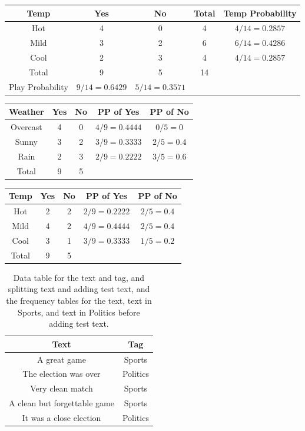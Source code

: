 \documentclass[12pt,twoside]{report}   %
\begin{document}
\begin{table}[H]
  \centering
  \begin{tabular}{|c|c|c|c|c|}
    \hline
    Temp & Yes & No & Total & Temp Probability\\
\hline
Hot & 4 & 0 & 4 & $4/14=0.2857$\\
Mild & 3 & 2 & 6 & $6/14=0.4286$\\ 
Cool & 2 & 3 & 4 & $4/14=0.2857$\\
\hline
Total & 9 & 5 & 14 &\\
\hline
Play Probability & $9/14=0.6429$ & $5/14=0.3571$ &&\\
    \hline
  \end{tabular}
\end{table}
\begin{table}[H]
  \centering
  \begin{tabular}{|c|c|c|c|c|}
    \hline
    Weather & Yes & No & PP of Yes & PP of No\\
\hline
Overcast & 4 & 0 & $4/9=0.4444$ & $0/5=0$\\
Sunny & 3 & 2 & $3/9=0.3333$ & $2/5=0.4$\\ 
Rain & 2 & 3 & $2/9=0.2222$ & $3/5=0.6$\\
\hline
Total & 9 & 5 &&\\
    \hline
  \end{tabular}
\end{table}
\begin{table}[H]
  \centering
  \begin{tabular}{|c|c|c|c|c|}
    \hline
    Temp & Yes & No & PP of Yes & PP of No\\
\hline
Hot & 2 & 2 & $2/9=0.2222$ & $2/5=0.4$\\
Mild & 4 & 2 & $4/9=0.4444$ & $2/5=0.4$\\ 
Cool & 3 & 1 & $3/9=0.3333$ & $1/5=0.2$\\
\hline
Total & 9 & 5 &&\\
    \hline
  \end{tabular}
\end{table}
\begin{table}[H]
  \centering
  \caption{Data table for the text and tag, and splitting text and adding test text, and the frequency tables for the text, text in Sports, and text in Politics before adding test text.}
  \label{tab:text}
  \begin{tabular}{|c|c|}
    \hline
    Text & Tag\\
\hline
A great game & Sports\\
The election was over & Politics\\ 
Very clean match & Sports\\
A clean but forgettable game & Sports\\
It was a close election & Politics\\
\hline
  \end{tabular}
\end{table}
\end{document}
